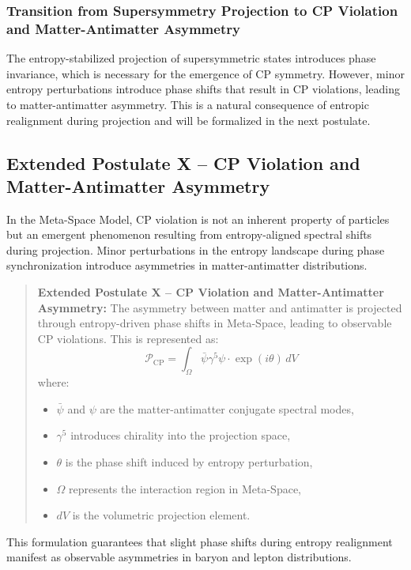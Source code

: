 \documentclass[10.5pt,a4paper]{article}
\begin{document}
\subsubsection*{Transition from Supersymmetry Projection to CP Violation and Matter-Antimatter Asymmetry}

The entropy-stabilized projection of supersymmetric states introduces phase invariance, which is necessary for 
the emergence of CP symmetry. However, minor entropy perturbations introduce phase shifts that result in CP 
violations, leading to matter-antimatter asymmetry. This is a natural consequence of entropic realignment 
during projection and will be formalized in the next postulate.

\subsection{Extended Postulate X – CP Violation and Matter-Antimatter Asymmetry}

In the Meta-Space Model, CP violation is not an inherent property of particles but an emergent phenomenon resulting 
from entropy-aligned spectral shifts during projection. Minor perturbations in the entropy landscape during phase 
synchronization introduce asymmetries in matter-antimatter distributions.

\begin{quote}
\textbf{Extended Postulate X – CP Violation and Matter-Antimatter Asymmetry:}  
The asymmetry between matter and antimatter is projected through entropy-driven phase shifts in Meta-Space, 
leading to observable CP violations. This is represented as:
\[
\mathcal{P}_{\text{CP}} = \int_\Omega \bar{\psi} \gamma^5 \psi \cdot \exp(i\theta) \, dV
\]
where:
\begin{itemize}
    \item $\bar{\psi}$ and $\psi$ are the matter-antimatter conjugate spectral modes,
    \item $\gamma^5$ introduces chirality into the projection space,
    \item $\theta$ is the phase shift induced by entropy perturbation,
    \item $\Omega$ represents the interaction region in Meta-Space,
    \item $dV$ is the volumetric projection element.
\end{itemize}
\end{quote}

This formulation guarantees that slight phase shifts during entropy realignment manifest as observable 
asymmetries in baryon and lepton distributions.
\end{document}
